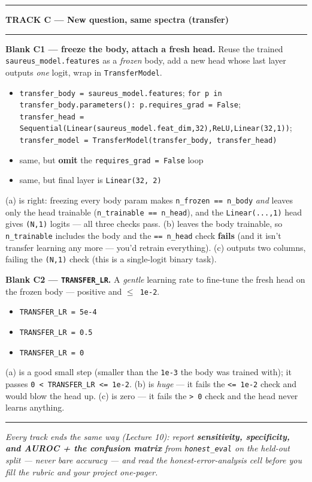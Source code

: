 \documentclass[11pt]{article}
\newcommand{\opt}[1]{\texttt{#1}}
\begin{document}
\vspace{3pt}\hrule
\begin{center}\textbf{TRACK C --- New question, same spectra (transfer)}\end{center}\hrule\vspace{4pt}

\textbf{Blank C1 --- freeze the body, attach a fresh head.}\; {\small Reuse the trained
\opt{saureus\_model.features} as a \emph{frozen} body, add a new head whose last layer outputs \emph{one}
logit, wrap in \opt{TransferModel}.}
\begin{itemize}
  \item[(a)] \opt{transfer\_body = saureus\_model.features};\;
    \opt{for p in transfer\_body.parameters(): p.requires\_grad = False};\\
    \hspace*{1.2em}\opt{transfer\_head = Sequential(Linear(saureus\_model.feat\_dim,32),ReLU,Linear(32,1))};\;
    \opt{transfer\_model = TransferModel(transfer\_body, transfer\_head)}
  \item[(b)] same, but \textbf{omit} the \opt{requires\_grad = False} loop
  \item[(c)] same, but final layer is \opt{Linear(32, 2)}
\end{itemize}
{\small (a) is right: freezing every body param makes \opt{n\_frozen == n\_body} \emph{and} leaves only the
head trainable (\opt{n\_trainable == n\_head}), and the \opt{Linear(...,1)} head gives \opt{(N,1)} logits ---
all three checks pass. (b) leaves the body trainable, so \opt{n\_trainable} includes the body and the
\opt{== n\_head} check \textbf{fails} (and it isn't transfer learning any more --- you'd retrain everything).
(c) outputs two columns, failing the \opt{(N,1)} check (this is a single-logit binary task).}

\vspace{3pt}
\textbf{Blank C2 --- \opt{TRANSFER\_LR}.}\; {\small A \emph{gentle} learning rate to fine-tune the fresh head
on the frozen body --- positive and \opt{$\le$ 1e-2}.}
\begin{itemize}
  \item[(a)] \opt{TRANSFER\_LR = 5e-4}
  \item[(b)] \opt{TRANSFER\_LR = 0.5}
  \item[(c)] \opt{TRANSFER\_LR = 0}
\end{itemize}
{\small (a) is a good small step (smaller than the \opt{1e-3} the body was trained with); it passes
\opt{0 < TRANSFER\_LR <= 1e-2}. (b) is \emph{huge} --- it fails the \opt{<= 1e-2} check and would blow the
head up. (c) is zero --- it fails the \opt{> 0} check and the head never learns anything.}

\vspace{4pt}\hrule\vspace{3pt}
{\small\itshape Every track ends the same way (Lecture 10): report \textbf{sensitivity, specificity,
and AUROC + the confusion matrix} from \opt{honest\_eval} on the held-out split --- \emph{never bare
accuracy} --- and read the honest-error-analysis cell before you fill the rubric and your project
one-pager.}
\end{document}
